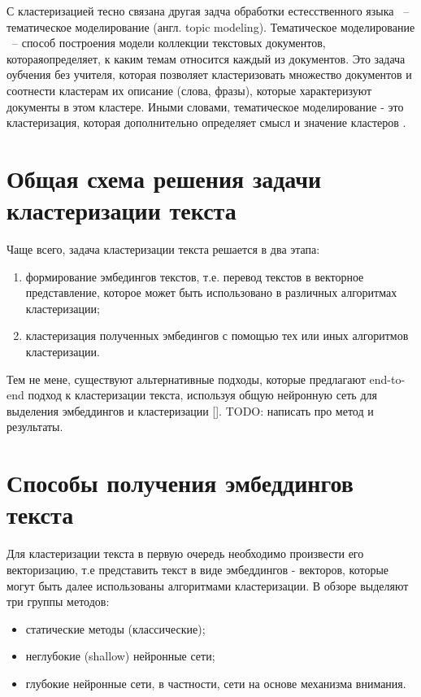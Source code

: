 С кластеризацией тесно связана другая задча обработки естесственного языка ~-- тематическое моделирование (англ. topic modeling). Тематическое моделирование ~-- способ построения модели коллекции текстовых документов, котораяопределяет, к каким темам относится каждый из документов. Это задача оубчения без учителя, которая позволяет кластеризовать множество документов и соотнести кластерам их описание (слова, фразы), которые характеризуют документы в этом кластере. Иными словами, тематическое моделирование - это кластеризация, которая дополнительно определяет смысл и значение кластеров \cite{no-patterns}.

\section{Общая схема решения задачи кластеризации текста}

Чаще всего, задача кластеризации текста решается в два этапа:
\begin{enumerate}
    \item формирование эмбедингов текстов, т.е. перевод текстов в векторное представление, которое может быть использовано в различных алгоритмах кластеризации;
    \item кластеризация полученных эмбедингов с помощью тех или иных алгоритмов кластеризации.
\end{enumerate}

Тем не мене, существуют альтернативные подходы, которые предлагают end-to-end подход к кластеризации текста, используя общую нейронную сеть для выделения эмбеддингов и кластеризации [\cite{end-to-end-clustering}]. TODO: написать про метод и результаты.

\section{Способы получения эмбеддингов текста}

Для кластеризации текста в первую очередь необходимо произвести его векторизацию, т.е представить текст в виде эмбеддингов - векторов, которые могут быть далее использованы алгоритмами кластеризации. В обзоре \cite{no-patterns} выделяют три группы методов:
\begin{itemize}
    \item статические методы (классические);
    \item неглубокие (shallow) нейронные сети;
    \item глубокие нейронные сети, в частности, сети на основе механизма внимания.
\end{itemize}

